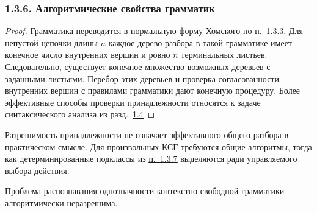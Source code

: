 \documentclass[mathserif,12pt,aspectratio=169]{beamer}
\def\DMref#1#2{{\color{blue}\underline{\hyperlink{#2}{#1}}}}
\begin{document}
\begin{frame}[t]
	\frametitle{1.3.6. Алгоритмические свойства грамматик }
	\setlength{\parskip}{1pt}
	\sloppy
	
	\begin{proof}
		\par\vspace{-4pt}
		Грамматика переводится в нормальную форму Хомского по \DMref{п.~1.3.3}{1.3.3.}. Для непустой цепочки длины $n$ каждое дерево разбора в такой грамматике имеет конечное число внутренних вершин и ровно $n$ терминальных листьев. Следовательно, существует конечное множество возможных деревьев с заданными листьями. Перебор этих деревьев и проверка согласованности внутренних вершин с правилами грамматики дают конечную процедуру. Более эффективные способы проверки принадлежности относятся к задаче синтаксического анализа из разд.~\DMref{1.4}{1.4.}
	\end{proof}
	
	\begin{remark}
		Разрешимость принадлежности не означает эффективного общего разбора в практическом смысле. Для произвольных КСГ требуются общие алгоритмы, тогда как детерминированные подклассы из \DMref{п.~1.3.7}{1.3.7.} выделяются ради управляемого выбора действия.
	\end{remark}
	
	\begin{theorem}
		Проблема распознавания однозначности контекстно-свободной грамматики алгоритмически неразрешима.
	\end{theorem}
	
\end{frame}
\end{document}
